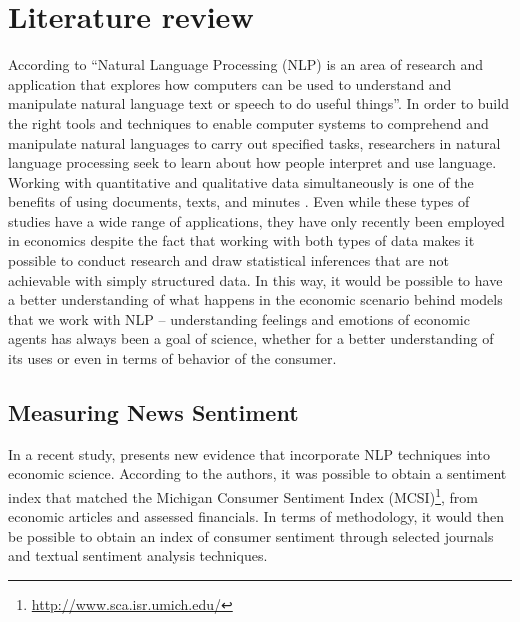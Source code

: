 \chapter{\textbf{Literature review}}  \label{chapter:lit}

According to \cite{chowdhury2003} ``Natural Language Processing (NLP) is an area of research and application that explores how computers can be used to understand and manipulate natural language text or speech to do useful things''. In order to build the right tools and techniques to enable computer systems to comprehend and manipulate natural languages to carry out specified tasks, researchers in natural language processing seek to learn about how people interpret and use language.\\

Working with quantitative and qualitative data simultaneously is one of the benefits of using documents, texts, and minutes \cite[p. 1]{bholat2015text}. Even while these types of studies have a wide range of applications, they have only recently been employed in economics despite the fact that working with both types of data makes it possible to conduct research and draw statistical inferences that are not achievable with simply structured data. In this way, it would be possible to have a better understanding of what happens in the economic scenario behind models that we work with NLP -- understanding feelings and emotions of economic agents has always been a goal of science, whether for a better understanding of its uses or even in terms of behavior of the consumer.\\

\section{Measuring News Sentiment}

In a recent study, \cite{shapiro2020measuring} presents new evidence that incorporate NLP techniques into economic science. According to the authors, it was possible to obtain a sentiment index that matched the Michigan Consumer Sentiment Index (MCSI)\footnote{\url{http://www.sca.isr.umich.edu/}}, from economic articles and assessed financials. In terms of methodology, it would then be possible to obtain an index of consumer sentiment through selected journals and textual sentiment analysis techniques.\\

